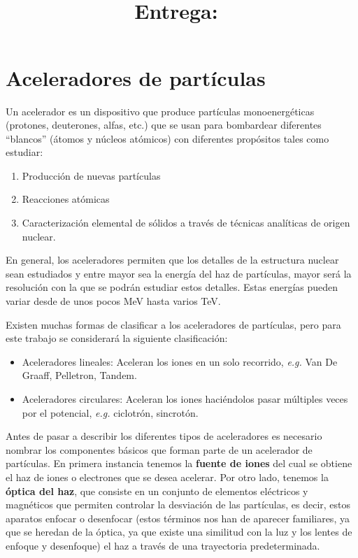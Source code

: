 \documentclass[12pt]{article}
\title{
    \textbf{\homeworknumber}\\
    \normalsize\vspace{0.1in}\small{\textbf{Entrega}:~\DTMusedate{duedate}}
    \vspace{-1.5in}
}
\author{}
\date{}
\theoremstyle{break}
\theoremstyle{nonumberbreak}
\begin{document}
    \maketitle
    \thispagestyle{fancy}

    \section{Aceleradores de partículas}

    Un acelerador\cite{andrade1971aceleradores} es un dispositivo que produce partículas monoenergéticas (protones, deuterones, alfas, etc.) que se usan para bombardear diferentes ``blancos'' (átomos y núcleos atómicos) con diferentes propósitos tales como estudiar: 

    \begin{enumerate}
      \item Producción de nuevas partículas
      \item Reacciones atómicas
      \item Caracterización elemental de sólidos a través de técnicas analíticas de origen nuclear.
    \end{enumerate}

    En general, los aceleradores permiten que los detalles de la estructura nuclear sean estudiados y entre mayor sea la energía del haz de partículas, mayor será la resolución con la que se podrán estudiar estos detalles. Estas energías pueden variar desde de unos pocos \unit{\MeV} hasta varios \unit{\TeV}.\cite{garcia2007subatomic}

    Existen muchas formas de clasificar a los aceleradores de partículas, pero para este trabajo se considerará la  siguiente clasificación:

    \begin{itemize}
      \item Aceleradores lineales: Aceleran los iones en un solo recorrido, \textit{e.g.} Van De Graaff, Pelletron, Tandem.
      \item Aceleradores circulares: Aceleran los iones haciéndolos pasar múltiples veces por el potencial, \textit{e.g.} ciclotrón, sincrotón.
    \end{itemize}

    Antes de pasar a describir los diferentes tipos de aceleradores es necesario nombrar los componentes básicos que forman parte de un acelerador de partículas. En primera instancia tenemos la \textbf{fuente de iones} del cual se obtiene el haz de iones o electrones que se desea acelerar. Por otro lado, tenemos la \textbf{óptica del haz}, que consiste en un conjunto de elementos eléctricos y magnéticos que permiten controlar la desviación de las partículas, es decir, estos aparatos enfocar o desenfocar (estos términos nos han de aparecer familiares, ya que se heredan de la óptica, ya que existe una similitud con la luz y los lentes de enfoque y desenfoque) el haz a través de una trayectoria predeterminada.
\end{document}
